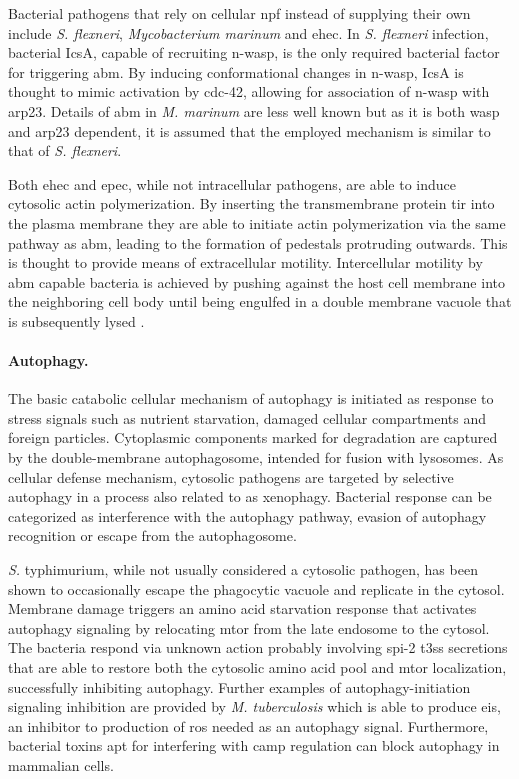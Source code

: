 Bacterial pathogens that rely on cellular \gls{npf} instead of supplying their own include \textit{S. flexneri}, \textit{Mycobacterium marinum}  and \gls{ehec}. In \textit{S. flexneri} infection, bacterial IcsA, capable of recruiting \gls{n-wasp}, is the only required bacterial factor for triggering \gls{abm}. By inducing conformational changes in \gls{n-wasp}, IcsA is thought to mimic activation by \gls{cdc-42}, allowing for association of \gls{n-wasp} with \gls{arp23}. Details of \gls{abm} in \textit{M. marinum} are less well known but as it is both \gls{wasp} and \gls{arp23} dependent, it is assumed that the employed mechanism is similar to that of \textit{S. flexneri}.

Both \gls{ehec} and \gls{epec}, while not intracellular pathogens, are able to induce cytosolic actin polymerization. By inserting the transmembrane protein \gls{tir} into the plasma membrane they are able to initiate actin polymerization via the same pathway as \gls{abm}, leading to the formation of pedestals protruding outwards. This is thought to provide means of extracellular motility. Intercellular motility by \gls{abm} capable bacteria is achieved by pushing against the host cell membrane into the neighboring cell body until being engulfed in a double membrane vacuole that is subsequently lysed \citep{Stevens2006,Haglund2011}.

\label{autophagy}
\paragraph{Autophagy.}
The basic catabolic cellular mechanism of autophagy is initiated as response to stress signals such as nutrient starvation, damaged cellular compartments and foreign particles. Cytoplasmic components marked for degradation are captured by the double-membrane autophagosome, intended for fusion with lysosomes. As cellular defense mechanism, cytosolic pathogens are targeted by selective autophagy in a process also related to as xenophagy. Bacterial response can be categorized as interference with the autophagy pathway, evasion of autophagy recognition or escape from the autophagosome.

\textit{S.} typhimurium, while not usually considered a cytosolic pathogen, has been shown to occasionally escape the phagocytic vacuole and replicate in the cytosol. Membrane damage triggers an amino acid starvation response that activates autophagy signaling by relocating \gls{mtor} from the late endosome to the cytosol. The bacteria respond via unknown action probably involving \acrshort{spi}-2 \gls{t3ss} secretions that are able to restore both the cytosolic amino acid pool and \gls{mtor} localization, successfully inhibiting autophagy. Further examples of autophagy-initiation signaling inhibition are provided by \textit{M. tuberculosis} which is able to produce \gls{eis}, an inhibitor to production of \gls{ros} needed as an autophagy signal. Furthermore, bacterial toxins apt for interfering with \gls{camp} regulation can block autophagy in mammalian cells.

